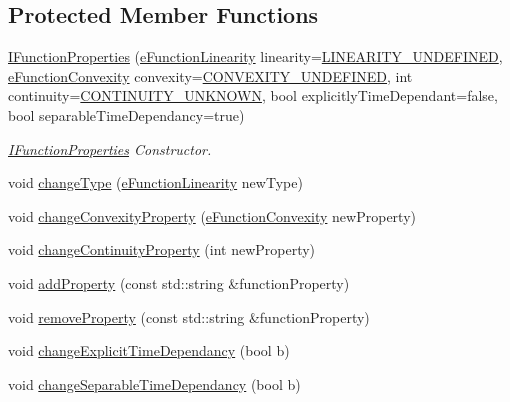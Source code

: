 \subsection*{Protected Member Functions}
\begin{DoxyCompactItemize}
\item 
\hyperlink{classocra_1_1IFunctionProperties_aee18136916b7dea9df2573cea45464ca}{I\+Function\+Properties} (\hyperlink{namespaceocra_a87b525b5508b0f6e9d931f14c7c226ab}{e\+Function\+Linearity} linearity=\hyperlink{namespaceocra_a87b525b5508b0f6e9d931f14c7c226abadd86a2dd3240e6df49a6e422b5abe075}{L\+I\+N\+E\+A\+R\+I\+T\+Y\+\_\+\+U\+N\+D\+E\+F\+I\+N\+ED}, \hyperlink{namespaceocra_ae6e8dca6121e9618486a449754876119}{e\+Function\+Convexity} convexity=\hyperlink{namespaceocra_ae6e8dca6121e9618486a449754876119a40aab88792841afe151808f879cfaa99}{C\+O\+N\+V\+E\+X\+I\+T\+Y\+\_\+\+U\+N\+D\+E\+F\+I\+N\+ED}, int continuity=\hyperlink{namespaceocra_ae5102ad1959d0c0dbf2eaa5610bbf728ad66557aadcf8856f9f135ff26db1a862}{C\+O\+N\+T\+I\+N\+U\+I\+T\+Y\+\_\+\+U\+N\+K\+N\+O\+WN}, bool explicitly\+Time\+Dependant=false, bool separable\+Time\+Dependancy=true)
\begin{DoxyCompactList}\small\item\em \hyperlink{classocra_1_1IFunctionProperties}{I\+Function\+Properties} Constructor. \end{DoxyCompactList}\item 
void \hyperlink{classocra_1_1IFunctionProperties_a49eb26106db8a6db9f3fbe87a641f433}{change\+Type} (\hyperlink{namespaceocra_a87b525b5508b0f6e9d931f14c7c226ab}{e\+Function\+Linearity} new\+Type)
\item 
void \hyperlink{classocra_1_1IFunctionProperties_a95fa18db8916e8671fed59cfdb40026c}{change\+Convexity\+Property} (\hyperlink{namespaceocra_ae6e8dca6121e9618486a449754876119}{e\+Function\+Convexity} new\+Property)
\item 
void \hyperlink{classocra_1_1IFunctionProperties_aba0abe2bbb7a6670b5af4fceaf7cce12}{change\+Continuity\+Property} (int new\+Property)
\item 
void \hyperlink{classocra_1_1IFunctionProperties_a2443a62c2cf3f5bc39f4fab1ddb1c66e}{add\+Property} (const std\+::string \&function\+Property)
\item 
void \hyperlink{classocra_1_1IFunctionProperties_a87bba6ce19795439ea768f148fb47391}{remove\+Property} (const std\+::string \&function\+Property)
\item 
void \hyperlink{classocra_1_1IFunctionProperties_a9081aa3e1561cb63c598e19d6e03797f}{change\+Explicit\+Time\+Dependancy} (bool b)
\item 
void \hyperlink{classocra_1_1IFunctionProperties_a2277e7388dcfac99b5722a8155deb793}{change\+Separable\+Time\+Dependancy} (bool b)
\end{DoxyCompactItemize}


